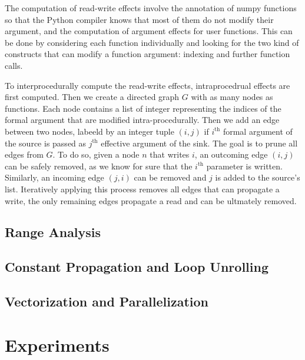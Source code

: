 \documentclass[10pt, preprint]{sigplanconf}
\begin{document}
The computation of read-write effects involve the annotation of numpy functions
so that the Python compiler knows that most of them do not modify their
argument, and the computation of argument effects for user functions. This can
be done by considering each function individually and looking for the two kind
of constructs that can modify a function argument: indexing and further
function calls.

To interprocedurally compute the read-write effects, intraprocedrual effects
are first computed. Then we create a directed graph $G$ with as many nodes as
functions. Each node contains a list of integer representing the indices of the
formal argument that are modified intra-procedurally. Then we add an edge
between two nodes, labeeld by an integer tuple $(i, j)$ if $i^\text{th}$ formal
argument of the source is passed as $j^\text{th}$ effective argument of the
sink. The goal is to prune all edges from $G$. To do so, given a node $n$ that
writes $i$, an outcoming edge $(i,j)$ can be safely removed, as we know for
sure that the $i^\text{th}$ parameter is written.  Similarly, an incoming edge
$(j,i)$ can be removed and $j$ is added to the source's list. Iteratively
applying this process removes all edges that can propagate a write, the only
remaining edges propagate a read and can be ultmately removed.


\subsection{Range Analysis}

\subsection{Constant Propagation and Loop Unrolling}

\subsection{Vectorization and Parallelization}

\cite{esterie2012boost, pyhpc2013, wpmvp2014}

\section{Experiments}
\label{sec:xp}

\end{document}
